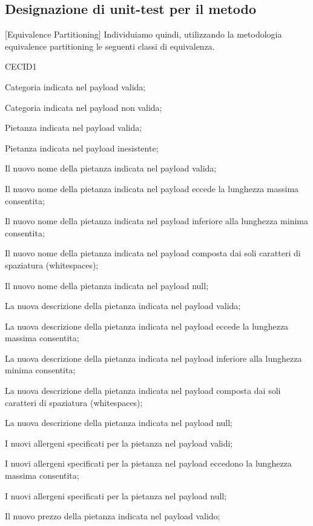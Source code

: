 \newpage
\subsection{Designazione di unit-test per il metodo}[Equivalence Partitioning]
Individuiamo quindi, utilizzando la metodologia equivalence partitioning le seguenti classi di equivalenza.
\begin{eqpart}{CECID1}
	\item[CECID1] Categoria indicata nel payload valida;
	\item[CECID2] Categoria indicata nel payload non valida;
	\item[CEPID1] Pietanza indicata nel payload valida;
	\item[CEPID2] Pietanza indicata nel payload inesistente;
	\item[CEN1] Il nuovo nome della pietanza indicata nel payload valida;
	\item[CEN2] Il nuovo nome della pietanza indicata nel payload eccede la lunghezza massima consentita;
	\item[CEN3] Il nuovo nome della pietanza indicata nel payload inferiore alla lunghezza minima consentita;
	\item[CEN4] Il nuovo nome della pietanza indicata nel payload composta dai soli caratteri di spaziatura (whitespaces);
	\item[CEN5] Il nuovo nome della pietanza indicata nel payload null;
	\item[CED1] La nuova descrizione della pietanza indicata nel payload valida;
	\item[CED2] La nuova descrizione della pietanza indicata nel payload eccede la lunghezza massima consentita;
	\item[CED3] La nuova descrizione della pietanza indicata nel payload inferiore alla lunghezza minima consentita;
	\item[CED4] La nuova descrizione della pietanza indicata nel payload composta dai soli caratteri di spaziatura (whitespaces);
	\item[CED5] La nuova descrizione della pietanza indicata nel payload null;
	\item[CEA1] I nuovi allergeni specificati per la pietanza nel payload validi;
	\item[CEA2] I nuovi allergeni specificati per la pietanza nel payload eccedono la lunghezza massima consentita;
	\item[CEA3] I nuovi allergeni specificati per la pietanza nel payload null;
	\item[CEP1] Il nuovo prezzo della pietanza indicata nel payload valido;

\end{eqpart}
